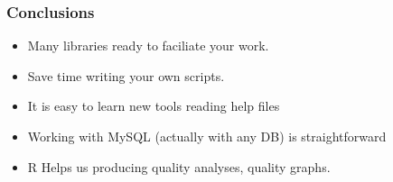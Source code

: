 \documentclass{beamer}
\begin{document}

\begin{frame}

\frametitle{Conclusions}
\begin{itemize}
 \item Many libraries ready to faciliate your work.
 \item Save time writing your own scripts.
 \item It is easy to learn new tools reading help files
 \item Working with MySQL (actually with any DB) is
 straightforward
 \item R Helps us producing quality analyses, quality graphs.
\end{itemize}

\end{frame}

\end{document}
